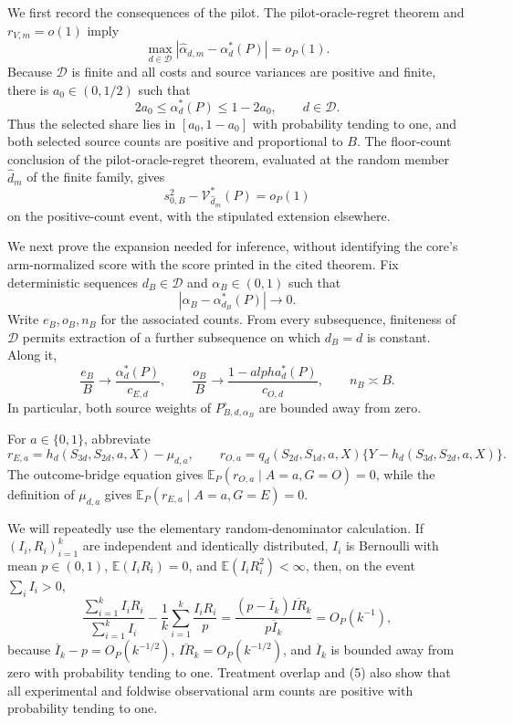 We first record the consequences of the pilot.  The pilot-oracle-regret theorem and \(r_{V,m}=o(1)\) imply
\[
 \max_{d\in\mathcal D}
 |\widehat\alpha_{d,m}-\alpha_d^*(P)|=o_P(1).                 \tag{1}
\]
Because \(\mathcal D\) is finite and all costs and source variances are positive and finite, there is \(a_0\in(0,1/2)\) such that
\[
 2a_0\le\alpha_d^*(P)\le1-2a_0,
 \qquad d\in\mathcal D.                                      \tag{2}
\]
Thus the selected share lies in \([a_0,1-a_0]\) with probability tending to one, and both selected source counts are positive and proportional to \(B\).  The floor-count conclusion of the pilot-oracle-regret theorem, evaluated at the random member \(\widehat d_m\) of the finite family, gives
\[
 s_{0,B}^2-\mathcal V_{\widehat d_m}^*(P)=o_P(1)              \tag{3}
\]
on the positive-count event, with the stipulated extension elsewhere.

We next prove the expansion needed for inference, without identifying the core's arm-normalized score with the score printed in the cited theorem.  Fix deterministic sequences \(d_B\in\mathcal D\) and \(\alpha_B\in(0,1)\) such that
\[
 |\alpha_B-\alpha_{d_B}^*(P)|\longrightarrow0.                \tag{4}
\]
Write \(e_B,o_B,n_B\) for the associated counts.  From every subsequence, finiteness of \(\mathcal D\) permits extraction of a further subsequence on which \(d_B=d\) is constant.  Along it,
\[
 \frac{e_B}{B}\longrightarrow\frac{\alpha_d^*(P)}{c_{E,d}},
 \qquad
 \frac{o_B}{B}\longrightarrow\frac{1-alpha_d^*(P)}{c_{O,d}},
 \qquad n_B\asymp B.                                         \tag{5}
\]
In particular, both source weights of \(P_{B,d,\alpha_B}^{\circ}\) are bounded away from zero.

For \(a\in\{0,1\}\), abbreviate
\[
 r_{E,a}=h_d(S_{3d},S_{2d},a,X)-\mu_{d,a},
 \qquad
 r_{O,a}=q_d(S_{2d},S_{1d},a,X)
 \{Y-h_d(S_{3d},S_{2d},a,X)\}.                              \tag{6}
\]
The outcome-bridge equation gives
\(\mathbb E_P(r_{O,a}\mid A=a,G=O)=0\), while the definition of \(\mu_{d,a}\) gives
\(\mathbb E_P(r_{E,a}\mid A=a,G=E)=0\).

We will repeatedly use the elementary random-denominator calculation.  If \((I_i,R_i)_{i=1}^k\) are independent and identically distributed, \(I_i\) is Bernoulli with mean \(p\in(0,1)\), \(\mathbb E(I_iR_i)=0\), and \(\mathbb E(I_iR_i^2)<\infty\), then, on the event \(\sum_iI_i>0\),
\[
 \frac{\sum_{i=1}^kI_iR_i}{\sum_{i=1}^kI_i}
 -\frac1k\sum_{i=1}^k\frac{I_iR_i}{p}
 =\frac{(p-\overline I_k)\overline{IR}_k}{p\overline I_k}
 =O_P(k^{-1}),                                                \tag{7}
\]
because \(\overline I_k-p=O_P(k^{-1/2})\),
\(\overline{IR}_k=O_P(k^{-1/2})\), and \(\overline I_k\) is bounded away from zero with probability tending to one.  Treatment overlap and (5) also show that all experimental and foldwise observational arm counts are positive with probability tending to one.


